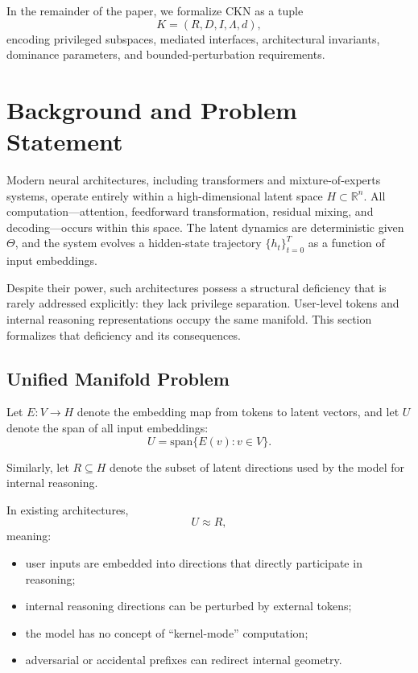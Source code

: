 \documentclass[11pt,a4paper]{article}
\begin{document}
In the remainder of the paper, we formalize CKN as a tuple
\[
K = (R, D, I, \Lambda, d),
\]
encoding privileged subspaces, mediated interfaces, architectural invariants, dominance parameters, and bounded-perturbation requirements.

\section{Background and Problem Statement}

Modern neural architectures, including transformers and mixture-of-experts systems, operate entirely within a high-dimensional latent space $H \subset \mathbb{R}^n$. All computation---attention, feedforward transformation, residual mixing, and decoding---occurs within this space. The latent dynamics are deterministic given $\Theta$, and the system evolves a hidden-state trajectory $\{h_t\}_{t=0}^T$ as a function of input embeddings.

Despite their power, such architectures possess a structural deficiency that is rarely addressed explicitly: they lack privilege separation. User-level tokens and internal reasoning representations occupy the same manifold. This section formalizes that deficiency and its consequences.

\subsection{Unified Manifold Problem}

Let $E: V \to H$ denote the embedding map from tokens to latent vectors, and let $U$ denote the span of all input embeddings:
\begin{equation}
U = \text{span}\{E(v) : v \in V\}.
\end{equation}

Similarly, let $R \subseteq H$ denote the subset of latent directions used by the model for internal reasoning.

In existing architectures,
\begin{equation}
U \approx R,
\end{equation}
meaning:
\begin{itemize}
    \item user inputs are embedded into directions that directly participate in reasoning;
    \item internal reasoning directions can be perturbed by external tokens;
    \item the model has no concept of ``kernel-mode'' computation;
    \item adversarial or accidental prefixes can redirect internal geometry.
\end{itemize}
\end{document}
